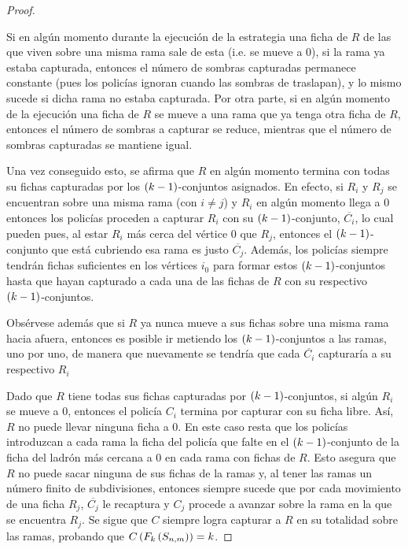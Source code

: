 \begin{proof}
\begin{enumerate}
            Si en alg\'un momento durante la ejecuci\'on de la estrategia una
            ficha de $R$ de las que viven sobre una misma rama sale de esta
            (i.e. se mueve a $0$), si la rama ya estaba capturada, entonces el
            n\'umero de sombras capturadas permanece constante (pues los
            polic\'ias ignoran cuando las sombras de traslapan), y lo mismo
            sucede si dicha rama no estaba capturada. Por otra parte, si en
            alg\'un momento de la ejecuci\'on una ficha de $R$ se mueve a una
            rama que ya tenga otra ficha de $R$, entonces el n\'umero de sombras
            a capturar se reduce, mientras que el n\'umero de sombras capturadas
            se mantiene igual.

            Una vez conseguido esto, se afirma que $R$ en alg\'un momento
            termina con todas su fichas capturadas por los $\left( k-1\right)$-conjuntos
            asignados. En efecto, si $R_i$ y $R_j$ se encuentran sobre una misma
            rama (con $i\neq j$) y $R_i$ en alg\'un momento llega a $0$ entonces
            los polic\'ias proceden a capturar $R_i$ con su $\left( k-1\right)$-conjunto,
            $\overline{C_i}$, lo cual pueden pues, al estar $R_i$ m\'as cerca
            del v\'ertice $0$ que $R_j$, entonces el $\left( k-1\right)$-conjunto que
            est\'a cubriendo esa rama es justo $\overline{C_j}$. Adem\'as, los
            polic\'ias siempre tendr\'an fichas suficientes en los v\'ertices
            $i_0$ para formar estos $\left( k-1\right)$-conjuntos hasta que hayan
            capturado a cada una de las fichas de $R$ con su respectivo
            $\left( k-1\right)$-conjuntos.
            
            Obs\'ervese adem\'as que si $R$ ya nunca mueve a sus fichas sobre
            una misma rama hacia afuera, entonces es posible ir metiendo los
            $\left( k-1\right)$-conjuntos a las ramas, uno por uno, de manera que
            nuevamente se tendr\'ia que cada $\overline{C_i}$ capturar\'ia a su
            respectivo $R_i$
        \end{enumerate}

        Dado que $R$ tiene todas sus fichas capturadas por $\left( k-1\right)$-conjuntos,
        si alg\'un $R_i$ se mueve a $0$, entonces el polic\'ia $C_i$ termina por
        capturar con su ficha libre. As\'i, $R$ no puede llevar ninguna ficha a
        $0$. En este caso resta que los polic\'ias introduzcan a cada rama la
        ficha del polic\'ia que falte en el $\left( k-1\right)$-conjunto de la ficha del
        ladr\'on m\'as cercana a $0$ en cada rama con fichas de $R$. Esto
        asegura que $R$ no puede sacar ninguna de sus fichas de la ramas y, al
        tener las ramas un n\'umero finito de subdivisiones, entonces siempre
        sucede que por cada movimiento de una ficha $R_j$, $\overline{C_j}$ le
        recaptura y $C_j$ procede a avanzar sobre la rama en la que se encuentra
        $R_j$. Se sigue que $C$ siempre logra capturar a $R$ en su totalidad
        sobre las ramas, probando que $C\left( F_k\left( S_{n,m}\right)\right)=k$.
        
        \end{proof}